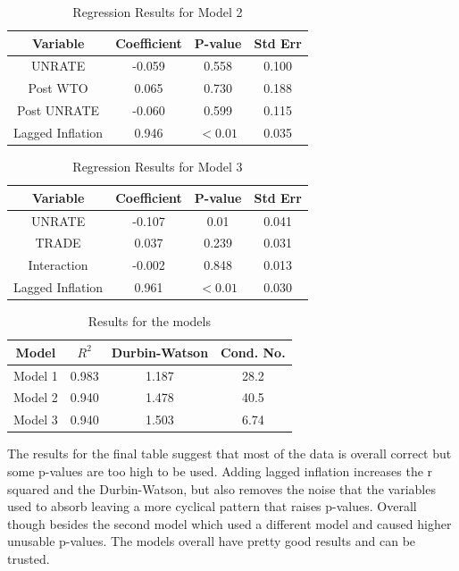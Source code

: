 \documentclass{article}
\begin{document}
\begin{table}[H]
\centering
\begin{tabular}{|c|c|c|c|}
\hline
Variable & Coefficient & P-value & Std Err \\
\hline
UNRATE & -0.059 & 0.558 & 0.100\\
Post WTO & 0.065 & 0.730 & 0.188\\
Post UNRATE & -0.060 & 0.599 & 0.115\\
Lagged Inflation & 0.946 & $<0.01$ & 0.035\\
\hline
\end{tabular}
\caption{Regression Results for Model 2}
\end{table}

\begin{table}[H]
\centering
\begin{tabular}{|c|c|c|c|}
\hline
Variable & Coefficient & P-value & Std Err \\
\hline
UNRATE & -0.107 & 0.01 & 0.041\\
TRADE & 0.037 & 0.239 & 0.031\\
Interaction & -0.002 & 0.848 & 0.013\\
Lagged Inflation & 0.961 & $<0.01$ & 0.030\\
\hline
\end{tabular}
\caption{Regression Results for Model 3}
\end{table}

\begin{table}[H]
\centering
\begin{tabular}{|c|c|c|c|}
\hline
Model & $R^2$ & Durbin-Watson & Cond. No. \\
\hline
Model 1 & 0.983 & 1.187 & 28.2\\
Model 2 & 0.940 & 1.478 & 40.5\\
Model 3 & 0.940 & 1.503 & 6.74\\
\hline
\end{tabular}
\caption{Results for the models}
\end{table}

The results for the final table suggest that most of the data is overall correct but some p-values are too high to be used. Adding lagged inflation increases the r squared and the Durbin-Watson, but also removes the noise that the variables used to absorb leaving a more cyclical pattern that raises p-values. Overall though besides the second model which used a different model and caused higher unusable p-values. The models overall have pretty good results and can be trusted.
\end{document}
